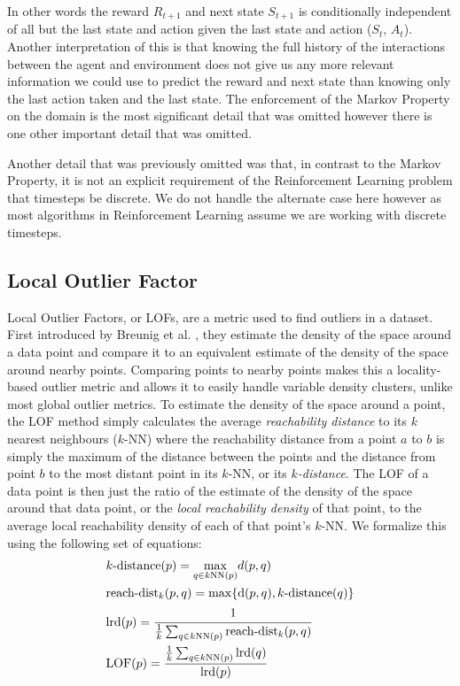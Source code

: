 \documentclass[../main.tex]{subfiles}
\begin{document}
In other words the reward $R_{t + 1}$ and next state $S_{t + 1}$ is conditionally independent of all but the last state and action given the last state and action ($S_t$, $A_t$). Another interpretation of this is that knowing the full history of the interactions between the agent and environment does not give us any more relevant information we could use to predict the reward and next state than knowing only the last action taken and the last state. The enforcement of the Markov Property on the domain is the most significant detail that was omitted however there is one other important detail that was omitted.

Another detail that was previously omitted was that, in contrast to the Markov Property, it is not an explicit requirement of the Reinforcement Learning problem that timesteps be discrete. We do not handle the alternate case here however as most algorithms in Reinforcement Learning assume we are working with discrete timesteps.

\subsection{Local Outlier Factor}
\label{sec:local_outlier_factor}

Local Outlier Factors, or LOFs, are a metric used to find outliers in a dataset. First introduced by Breunig et al. \cite{DBLP:conf/sigmod/BreunigKNS00}, they estimate the density of the space around a data point and compare it to an equivalent estimate of the density of the space around nearby points. Comparing points to nearby points makes this a locality-based outlier metric and allows it to easily handle variable density clusters, unlike most global outlier metrics. To estimate the density of the space around a point, the LOF method simply calculates the average \textit{reachability distance} to its $k$ nearest neighbours ($k$-NN) where the reachability distance from a point $a$ to $b$ is simply the maximum of the distance between the points and the distance from point $b$ to the most distant point in its $k$-NN, or its \textit{$k$-distance}. The LOF of a data point is then just the ratio of the estimate of the density of the space around that data point, or the \textit{local reachability density} of that point, to the average local reachability density of each of that point's $k$-NN. We formalize this using the following set of equations:
\begin{align}
    \label{eqn:lof}
    &k\text{-distance}(p) = \underset{q \in k\text{NN}(p)}{\max} d(p, q) \\
    &\text{reach-dist}_k(p,q) = \max\{\text{d}(p,q), k\text{-distance}(q)\} \\
    &\text{lrd}(p) = \cfrac{1}{\frac{1}{k} \sum_{q \in k\text{NN}(p)} \text{reach-dist}_k(p, q)} \\
    &\text{LOF}(p) = \cfrac{\frac{1}{k} \sum_{q \in k\text{NN}(p)} \text{lrd}(q)}{\text{lrd}(p)}
\end{align}
\end{document}
